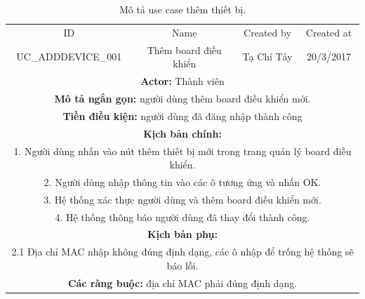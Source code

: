 \documentclass[a4paper,12pt,oneside]{article}
\begin{document}
\begin{table}[!htp]
\centering
\begin{tabularx}{\linewidth}{ |c||c|c|c| }
\hline
ID & Name & Created by & Created at\\
UC\_ADDDEVICE\_001 & Thêm board điều khiển & Tạ Chí Tây & 20/3/2017\\
\hline
\multicolumn{4}{|X|}{\textbf{Actor:} Thành viên }\\
\hline
\multicolumn{4}{|X|}{\textbf{Mô tả ngắn gọn:} người dùng thêm board điều khiển mới.}\\
\hline
\multicolumn{4}{|X|}{\textbf{Tiền điều kiện:} người dùng đã đăng nhập thành công}\\
\hline
\multicolumn{4}{|X|}{\textbf{Kịch bản chính:}}\\
\multicolumn{4}{|X|}{1. Người dùng nhấn vào nút thêm thiết bị mới trong trang quản lý board điều khiển.}\\
\multicolumn{4}{|X|}{
2.	Người dùng nhập thông tin vào các ô tương ứng và nhấn OK.}\\
\multicolumn{4}{|X|}{
3.	Hệ thống xác thực người dùng và thêm board điều khiển mới.}\\
\multicolumn{4}{|X|}{
4.	Hệ thống thông báo người dùng đã thay đổi thành công.}\\
\hline
\multicolumn{4}{|X|}{\textbf{Kịch bản phụ:}}\\
\multicolumn{4}{|X|}{2.1    Địa chỉ MAC nhập không đúng định dạng, các ô nhập để trống hệ thống sẽ báo lỗi.}\\
\hline
\multicolumn{4}{|X|}{\textbf{Các ràng buộc:} địa chỉ MAC phải đúng định dạng.}\\
\hline

\end{tabularx}
\caption{Mô tả use case thêm thiết bị.}
\end{table}
\end{document}
